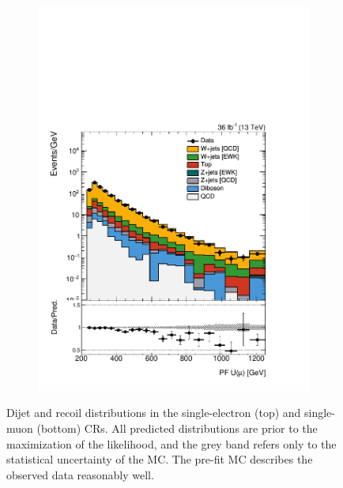 \begin{figure}[]
\begin{center}
\begin{subfigure}[t]{0.24\textwidth}
            \includegraphics[width=\textwidth]{figures/vbf/prefit/singlemuon_pfUWmag_logy.pdf}
        \end{subfigure}
        \caption{Dijet and recoil distributions in the single-electron (top) and single-muon (bottom) CRs.
                 All predicted distributions are prior to the maximization of the likelihood, and the grey band refers only to the statistical uncertainty of the MC.
                 The pre-fit MC describes the observed data reasonably well.
        }
        \label{fig:vbf:wcr}
    \end{center}
\end{figure}


